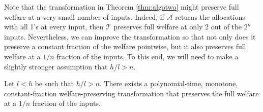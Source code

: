 \documentclass[runningheads,a4paper]{llncs}
\begin{document}
Note that the transformation in Theorem \ref{thm:algotwo} might preserve full welfare at a very small number of inputs. Indeed, if $\mathcal{A}$ returns the allocations with all 1's at every input, then $\mathcal{T}$ preserves full welfare at only 2 out of the $2^n$ inputs. Nevertheless, we can improve the transformation so that not only does it preserve a constant fraction of the welfare pointwise, but it also preserves full welfare at a $1/n$ fraction of the inputs. To this end, we will need to make a slightly stronger assumption that $h/l>n$.

\begin{theorem}
\label{thm:algotwobetter}
Let $l<h$ be such that $h/l>n$. There exists a polynomial-time, monotone, constant-fraction welfare-preserving transformation that preserves the full welfare at a $1/n$ fraction of the inputs.
\end{theorem}
\end{document}
